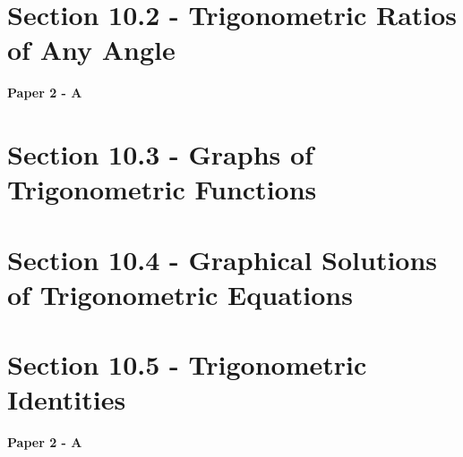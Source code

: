 \documentclass[12pt, a4paper]{article}
\begin{document}
\section*{Section 10.2 - Trigonometric Ratios of Any Angle }\label{section:4-10-2}

\textbf{Paper 2 - A}
\begin{enumx}[label=\arabic*.,start=1]
\item {}\label{DSE2022-CoreP2-Q25} 
\item {}\label{DSE2023-CoreP2-Q24} 
\end{enumx}




\section*{Section 10.3 - Graphs of Trigonometric Functions}\label{section:4-10-3}





\section*{Section 10.4 - Graphical Solutions of Trigonometric Equations}\label{section:4-10-4}





\section*{Section 10.5 - Trigonometric Identities}\label{section:4-10-5}

\textbf{Paper 2 - A}
\begin{enumx}[label=\arabic*.,start=3]
\item {}\label{DSE2012S-CoreP2-Q19} 
\item {}\label{DSE2012-CoreP2-Q19} 
\item {}\label{DSE2014-CoreP2-Q19} 
\item {}\label{DSE2015-CoreP2-Q19} 
\end{enumx}
\end{document}

